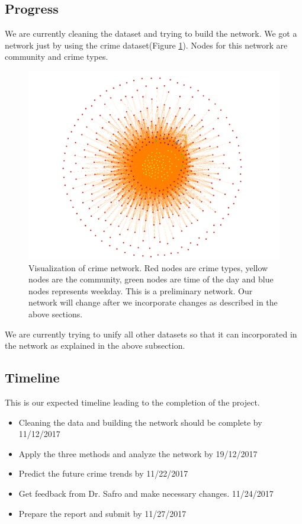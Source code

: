 \documentclass{article}
\begin{document}
\subsection{Progress}
We are currently cleaning the dataset and trying to build the network. We got a network just by using the crime dataset(Figure \ref{fig:fig1}). Nodes for this network are community and crime types.
\begin{figure}
	\includegraphics[scale=0.4, trim={0 0.5cm 0 6cm}]{network_vis.png}
	\caption{Visualization of crime network. Red nodes are crime types, yellow nodes are the community, green nodes are time of the day and blue nodes represents weekday. This is a preliminary network. Our network will change after we incorporate changes as described in the above sections.}
	\label{fig:fig1}
\end{figure}

We are currently trying to unify all other datasets so that it can incorporated in the network as explained in the above subsection.

\subsection{Timeline}
This is our expected timeline leading to the completion of the project.
\begin{itemize}
\item Cleaning the data and building the network should be complete by 11/12/2017
\item Apply the three methods and analyze the network by 19/12/2017
\item Predict the future crime trends by 11/22/2017
\item Get feedback from Dr. Safro and make necessary changes. 11/24/2017
\item Prepare the report and submit by 11/27/2017
\end{itemize}
\end{document}
